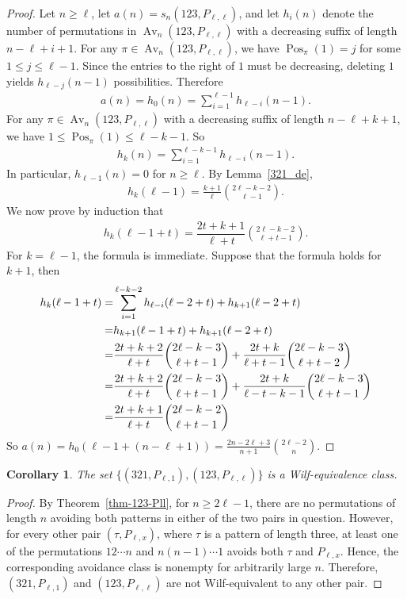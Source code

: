 \documentclass[11pt]{article}
\newtheorem{cor}[thm]{Corollary}
\begin{document}
\begin{proof}
Let $n\geq\ell$, let $a(n)=s_n(123,P_{\ell,\ell})$, and let $h_i(n)$
denote the number of permutations in
$\operatorname{Av}_n(123,P_{\ell,\ell})$ with a decreasing suffix of length
$n-\ell+i+1$. For any
$\pi\in\operatorname{Av}_n(123,P_{\ell,\ell})$, we have
$\operatorname{Pos}_\pi(1)=j$ for some $1\leq j\leq\ell-1$.
Since the entries to the right of $1$ must be decreasing, deleting $1$
yields $h_{\ell-j}(n-1)$ possibilities. Therefore
\begin{align*}
  a(n)=h_0(n)=\sum_{i=1}^{\ell-1}h_{\ell-i}(n-1).
\end{align*}
For any $\pi\in\operatorname{Av}_n(123,P_{\ell,\ell})$ with a decreasing
suffix of length $n-\ell+k+1$, we have
$1\leq \operatorname{Pos}_\pi(1)\leq \ell-k-1$. So
\begin{align*}
h_k(n)=\sum_{i=1}^{\ell-k-1}h_{\ell-i}(n-1).
\end{align*}
In particular, $h_{\ell-1}(n)=0$ for $n\geq\ell$. By
Lemma~\ref{321_de},
\begin{align*}
h_k(\ell-1)=\frac{k+1}{\ell}\binom{2\ell-k-2}{\ell-1}.
\end{align*}
We now prove by induction that
\begin{align*}
h_k(\ell-1+t)
=
\dfrac{2t+k+1}{\ell+t}
\binom{2\ell-k-2}{\ell+t-1}.
\end{align*}
For $k=\ell-1$, the formula is immediate.
Suppose that the formula holds for $k+1$, then
\begin{align}
h_k(\ell-1+t)=&\sum_{i=1}^{\ell-k-2}h_{\ell-i}(\ell-2+t)+h_{k+1}(\ell-2+t)\notag\\
=&h_{k+1}(\ell-1+t)+h_{k+1}(\ell-2+t)\notag\\
=&\dfrac{2t+k+2}{\ell+t}\binom{2\ell-k-3}{\ell+t-1}+\dfrac{2t+k}{\ell+t-1}\binom{2\ell-k-3}{\ell+t-2}\notag\\
=&\dfrac{2t+k+2}{\ell+t}\binom{2\ell-k-3}{\ell+t-1}+\dfrac{2t+k}{\ell-t-k-1}\binom{2\ell-k-3}{\ell+t-1}\notag\\
=&\dfrac{2t+k+1}{\ell+t}\binom{2\ell-k-2}{\ell+t-1}\notag
\end{align}
So $a(n)=h_0(\ell-1+(n-\ell+1))=\frac{2n-2\ell+3}{n+1}\binom{2\ell-2}n$.
\end{proof}
\begin{cor}\label{cor-321}
The set $\{(321,P_{\ell,1}),(123,P_{\ell,\ell})\}$ is a
Wilf-equivalence class.
\end{cor}

\begin{proof}
By Theorem~\ref{thm-123-Pll}, for $n\geq 2\ell-1$, there are no
permutations of length $n$ avoiding both patterns in either of the two
pairs in question. However, for every other pair $(\tau,P_{\ell,x})$,
where $\tau$ is a pattern of length three, at least one of the permutations
$12\cdots n$ and $n(n-1)\cdots1$ avoids both $\tau$ and $P_{\ell,x}$.
Hence, the corresponding avoidance class is nonempty for arbitrarily large
$n$. Therefore, $(321,P_{\ell,1})$ and $(123,P_{\ell,\ell})$ are not
Wilf-equivalent to any other pair.
\end{proof}
\end{document}
